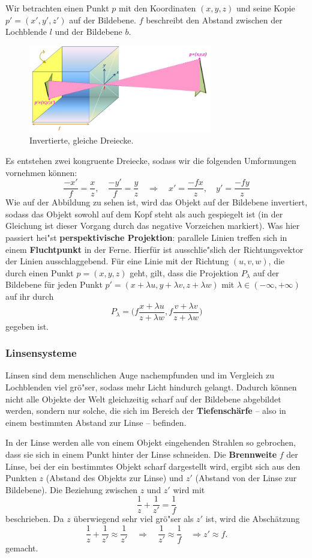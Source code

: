 Wir betrachten einen Punkt $p$ mit den Koordinaten $(x,y,z)$ und seine \glqq Kopie\grqq\ $p'=(x',y',z')$ auf der Bildebene. $f$ beschreibt den Abstand zwischen der Lochblende $l$ und der Bildebene $b$.
\begin{figure}[h]
\centering
\includegraphics[width=8cm]{chapters/computervision/Grafik_2_Lochkamera.JPG}
\caption{Invertierte, gleiche Dreiecke.}
\label{fig:2}
\end{figure}
Es entstehen zwei kongruente Dreiecke, sodass wir die folgenden Umformungen vornehmen können:
\[\frac{-x'}{f}=\frac{x}{z},\quad \frac{-y'}{f}=\frac{y}{z} \quad \Rightarrow \quad x'=\frac{-fx}{z}, \quad y'=\frac{-fy}{z}\]
Wie auf der Abbildung zu sehen ist, wird das Objekt auf der Bildebene invertiert, sodass das Objekt sowohl auf dem Kopf steht als auch gespiegelt ist (in der Gleichung ist dieser Vorgang durch das negative Vorzeichen markiert). Was hier passiert hei"st \textbf{perspektivische Projektion}: parallele Linien treffen sich in einem \textbf{Fluchtpunkt} in der Ferne. Hierfür ist ausschlie"slich der Richtungsvektor der Linien ausschlaggebend.
Für eine Linie mit der Richtung $(u,v,w)$, die durch einen Punkt $p=(x,y,z)$ geht, gilt, dass die Projektion $P_\lambda$ auf der Bildebene für jeden Punkt $p'=(x+\lambda u,y+\lambda v,z+\lambda w)$ mit $\lambda\in (-\infty,+\infty)$ auf ihr durch
\[P_\lambda=\Bigg( f\frac{x+\lambda u}{z+\lambda w},f\frac{v+\lambda v}{z+\lambda w} \Bigg)\]
gegeben ist.

\subsubsection{Linsensysteme}
Linsen sind dem menschlichen Auge nachempfunden und im Vergleich zu Lochblenden viel grö"ser, sodass mehr Licht hindurch gelangt. Dadurch können nicht alle Objekte der Welt gleichzeitig scharf auf der Bildebene abgebildet werden, sondern nur solche, die sich im Bereich der \textbf{Tiefenschärfe} -- also in einem bestimmten Abstand zur Linse -- befinden.

In der Linse werden alle von einem Objekt eingehenden Strahlen so gebrochen, dass sie sich in einem Punkt hinter der Linse schneiden.
Die \textbf{Brennweite} $f$ der Linse, bei der ein bestimmtes Objekt scharf dargestellt wird, ergibt sich aus den Punkten $z$ (Abstand des Objekts zur Linse) und $z'$ (Abstand von der Linse zur Bildebene). Die Beziehung zwischen $z$ und $z'$ wird mit
\[\frac{1}{z}+\frac{1}{z'}=\frac{1}{f}\]
beschrieben. Da $z$ überwiegend sehr viel grö"ser als $z'$ ist, wird die Abschätzung
\[\frac{1}{z}+\frac{1}{z'}\approx\frac{1}{z'}\quad\Rightarrow\quad\frac{1}{z'}\approx\frac{1}{f}\quad\Rightarrow z'\approx f.\]
gemacht.

